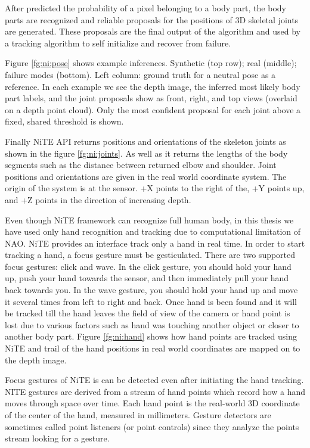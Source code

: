 After predicted the probability of a pixel belonging to a body part, the body parts are recognized and reliable proposals for the positions of 3D skeletal joints are generated. These proposals are the final output of the algorithm and used by a tracking algorithm to self initialize and recover from failure.



Figure \ref{fg:ni:pose} shows example inferences. Synthetic (top row); real (middle); failure modes (bottom). Left column: ground truth for a neutral pose as a reference. In each example we see the depth image, the inferred most likely body part labels, and the joint proposals show as front, right, and top views (overlaid on a depth point cloud). Only the most confident proposal for each joint above a fixed, shared threshold is shown.

Finally NiTE API returns positions and orientations of the skeleton joints as shown in the figure \ref{fg:ni:joints}. As well as it returns the lengths of the body segments such as the distance between returned elbow and shoulder. Joint positions and orientations are given in the real world coordinate system. The origin of the system is at the sensor. +X points to the right of the, +Y points up, and +Z points in the direction of increasing depth. 



Even though NiTE framework can recognize full human body, in this thesis we have used only hand recognition and tracking due to computational limitation of NAO. NiTE provides an interface track only a hand in real time. In order to start tracking a hand, a focus gesture must be gesticulated. There are two supported focus gestures: click and wave. In the click gesture, you should hold your hand up, push your hand towards the sensor, and then immediately pull your hand back towards you. In the wave gesture, you should hold your hand up and move it several times from left to right and back. Once hand is been found and it will be tracked till the hand leaves the field of view of the camera or hand point is lost due to various factors such as hand was touching another object or closer to another body part. Figure \ref{fg:ni:hand} shows how hand points are tracked using NiTE and trail of the hand positions in real world coordinates are mapped on to the depth image.



Focus gestures of NiTE is can be detected even after initiating the hand tracking. NITE gestures are derived from a stream of hand points which record how a hand moves through space over time. Each hand point is the real-world 3D coordinate of the center of the hand, measured in millimeters. Gesture detectors are sometimes called point listeners (or point controls) since they analyze the points stream looking for a gesture. 

